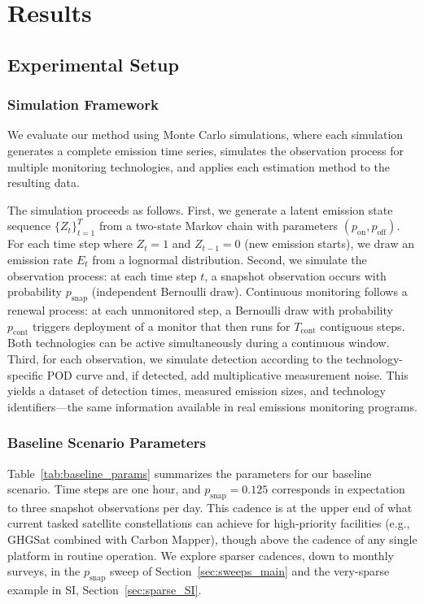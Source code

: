 \documentclass[unnumsec,webpdf,modern,mediumone]{oup-authoring-template}
\newcommand{\edit}[1]{{\color{magenta}#1}}
\begin{document}
\newpage

\section{Results}
\label{sec:results}


\subsection{Experimental Setup}

\subsubsection{Simulation Framework}

We evaluate our method using Monte Carlo simulations, where each simulation generates a complete emission time series, simulates the observation process for multiple monitoring technologies, and applies each estimation method to the resulting data.

The simulation proceeds as follows. First, we generate a latent emission state sequence $\{Z_t\}_{t=1}^T$ from a two-state Markov chain with parameters $(p_{\text{on}}, p_{\text{off}})$. For each time step where $Z_t = 1$ and $Z_{t-1}=0$ (new emission starts), we draw an emission rate $E_t$ from a lognormal distribution. Second, we simulate the observation process: at each time step $t$, a snapshot observation occurs with probability $p_{\text{snap}}$ (independent Bernoulli draw). Continuous monitoring follows a renewal process: at each unmonitored step, a Bernoulli draw with probability $p_{\text{cont}}$ triggers deployment of a monitor that then runs for $T_{\text{cont}}$ contiguous steps. Both technologies can be active simultaneously during a continuous window. Third, for each observation, we simulate detection according to the technology-specific POD curve and, if detected, add multiplicative measurement noise. This yields a dataset of detection times, measured emission sizes, and technology identifiers---the same information available in real emissions monitoring programs.

\subsubsection{Baseline Scenario Parameters}

\edit{Table~\ref{tab:baseline_params} summarizes the parameters for our baseline scenario. Time steps are one hour, and $p_{\text{snap}} = 0.125$ corresponds in expectation to three snapshot observations per day. This cadence is at the upper end of what current tasked satellite constellations can achieve for high-priority facilities (e.g., GHGSat combined with Carbon Mapper), though above the cadence of any single platform in routine operation. We explore sparser cadences, down to monthly surveys, in the $p_{\text{snap}}$ sweep of Section~\ref{sec:sweeps_main} and the very-sparse example in SI, Section~\ref{sec:sparse_SI}.}
\end{document}
